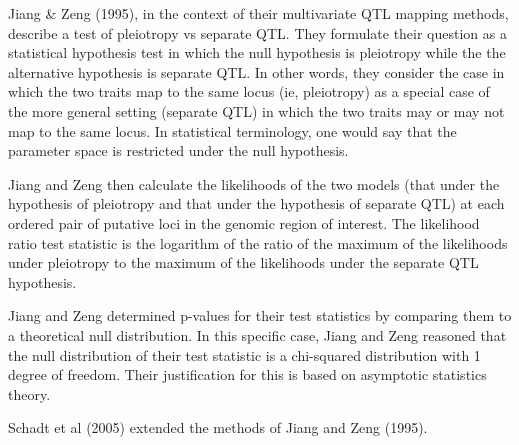 \documentclass[]{article}
\begin{document}
Jiang \& Zeng (1995), in the context of their multivariate QTL mapping methods, describe a test of pleiotropy vs separate QTL. They formulate their question as a statistical hypothesis test in which the null hypothesis is pleiotropy while the the alternative hypothesis is separate QTL. In other words, they consider the case in which the two traits map to the same locus (ie, pleiotropy) as a special case of the more general setting (separate QTL) in which the two traits may or may not map to the same locus. In statistical terminology, one would say that the parameter space is restricted under the null hypothesis.

Jiang and Zeng then calculate the likelihoods of the two models (that under the hypothesis of pleiotropy and that under the hypothesis of separate QTL) at each ordered pair of putative loci in the genomic region of interest. The likelihood ratio test statistic is the logarithm of the ratio of the maximum of the likelihoods under pleiotropy to the maximum of the likelihoods under the separate QTL hypothesis. 

Jiang and Zeng determined p-values for their test statistics by comparing them to a theoretical null distribution. In this specific case, Jiang and Zeng reasoned that the null distribution of their test statistic is a chi-squared distribution with 1 degree of freedom. Their justification for this is based on asymptotic statistics theory.

Schadt et al (2005) extended the methods of Jiang and Zeng (1995). 





\printbibliography
\end{document}
